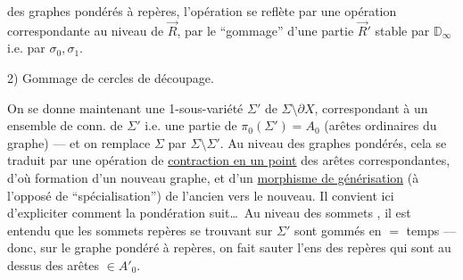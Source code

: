 
des graphes pondérés à repères, l'opération 
se reflète par une opération correspondante au niveau de $\vec R$, par le ``gommage'' d'une partie $\vec R'$ stable par $\mathbb D_\infty$ i.e. par $\sigma_0,\sigma_1$.

2) Gommage de cercles de découpage.

On se donne maintenant une  1-sous-variété
  $\Sigma'$ de $\Sigma\setminus\partial X$,
correspondant à un ensemble  de  conn. de $\Sigma'$ i.e. une partie  de $\pi_0(\Sigma')=A_0$
(arêtes ordinaires du graphe) --- et on remplace $\Sigma$ par $\Sigma\setminus\Sigma'$.
Au niveau des graphes pondérés, cela se traduit par une opération de \uline{contraction en un point} des arêtes correspondantes, d'où formation d'un nouveau graphe, et d'un \uline{morphisme de générisation} (à l'opposé de ``spécialisation'') de l'ancien vers le nouveau.
Il convient ici d'expliciter comment la pondération suit\ldots\
Au niveau des sommets , il est entendu que les sommets repères se trouvant sur $\Sigma'$ sont gommés en $=$ temps --- donc, sur le graphe pondéré à repères, on fait sauter l'ens des repères qui sont au dessus des arêtes $\in A'_0$.
\mspage{53}
